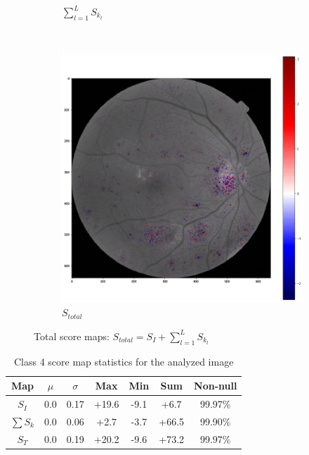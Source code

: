 \documentclass[review]{elsarticle}
\theoremstyle{definition} %
\theoremstyle{remark}
\begin{document}
\begin{figure}[!ht]
\begin{subfigure}{0.45\textwidth}
		\caption{$\sum_{l=1}^L S_{k_l}$}
		\label{fig:score_kmapped}
	\end{subfigure}
	~ %
	\begin{subfigure}{0.45\textwidth}
		\includegraphics[width=\textwidth]{./figures/maps/tot.png}
		\caption{$S_{total}$}
		\label{fig:score_total}
	\end{subfigure}
	\caption{Total score maps: $S_{total} = S_I + \sum_{l=1}^L S_{k_l}$}
	\label{fig:total_score_maps}
\end{figure}


\begin{table}[ht]
	\centering
	\begin{tabular}{c c c c c c c}
		\hline
		\hline                        
		Map & $\mu$ & $\sigma$ & Max & Min & Sum & Non-null \\ 
		\hline
		$S_I$ & 0.0 & 0.17 & +19.6 & -9.1 & +6.7 & 99.97\%  \\
		$\sum S_k$ & 0.0 & 0.06 & +2.7 & -3.7 & +66.5 & 99.90\% \\
		$S_T$ & 0.0 & 0.19 & +20.2 & -9.6 & +73.2 & 99.97\% \\  
		\hline
	\end{tabular}
	\caption{Class 4 score map statistics for the analyzed image}
	\label{table:score_stats}
\end{table}
\end{document}
